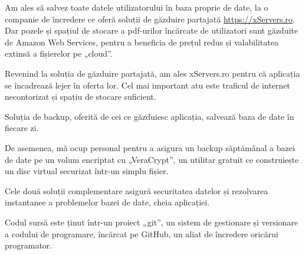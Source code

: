 	Am ales să salvez toate datele utilizatorului în baza proprie de date, la o companie de încredere ce oferă soluții de găzduire partajată \url{https://xServers.ro}\cite{xservers}. Dar pozele și spațiul de stocare a pdf-urilor încărcate de utilizatori sunt găzduite de Amazon Web Services\cite{aws}, pentru a beneficia de prețul redus și valabilitatea extinsă a fișierelor pe „cloud”.

	Revenind la soluția de găzduire partajată, am ales xServers.ro\cite{xservers} pentru că aplicația se încadrează lejer în oferta lor. Cel mai important atu este traficul de internet necontorizat și spațiu de stocare suficient.

	Soluția de backup, oferită de cei ce găzduiesc aplicația, salvează baza de date în fiecare zi.

	De asemenea, mă ocup personal pentru a asigura un backup săptămânal a bazei de date pe un volum encriptat cu „VeraCrypt”\cite{veracrypt}, un utilitar gratuit ce construiește un disc virtual securizat într-un simplu fișier. 

	Cele două soluții complementare asigură securitatea datelor și rezolvarea instantanee a problemelor bazei de date, cheia aplicației. 

	Codul sursă este ținut într-un proiect „git”, un sistem de gestionare și versionare a codului de programare, încărcat pe GitHub, un aliat de încredere oricărui programator.